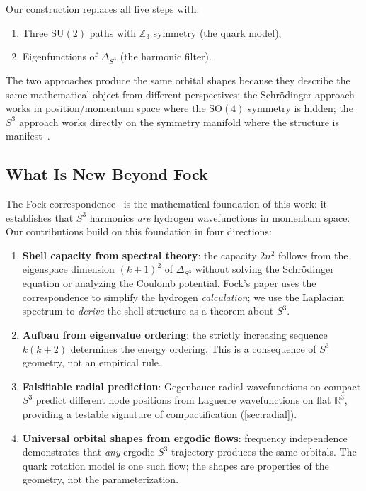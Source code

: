 \documentclass[12pt, a4paper]{article}
\theoremstyle{definition}
\theoremstyle{remark}
\newcommand{\Sthree}{S^3}
\newcommand{\SU}{\mathrm{SU}(2)}
\newcommand{\SO}{\mathrm{SO}}
\newcommand{\R}{\mathbb{R}}
\newcommand{\Z}{\mathbb{Z}}
\newcommand{\lap}{\Delta_{\Sthree}}
\begin{document}
Our construction replaces all five steps with:
\begin{enumerate}[nosep]
  \item Three $\SU$ paths with $\Z_3$ symmetry (the quark model),
  \item Eigenfunctions of $\lap$ (the harmonic filter).
\end{enumerate}

The two approaches produce the same orbital shapes because they describe
the same mathematical object from different perspectives: the Schr\"odinger
approach works in position/momentum space where the $\SO(4)$ symmetry is
hidden; the $\Sthree$ approach works directly on the symmetry manifold
where the structure is manifest~\cite{fock1935,bander1966}.

\subsection{What Is New Beyond Fock}

The Fock correspondence~\cite{fock1935} is the mathematical foundation of
this work: it establishes that $\Sthree$ harmonics \emph{are} hydrogen
wavefunctions in momentum space. Our contributions build on this foundation
in four directions:

\begin{enumerate}[nosep]
  \item \textbf{Shell capacity from spectral theory}: the capacity $2n^2$
    follows from the eigenspace dimension $(k{+}1)^2$ of $\lap$ without
    solving the Schr\"odinger equation or analyzing the Coulomb
    potential. Fock's paper uses the correspondence to simplify the hydrogen
    \emph{calculation}; we use the Laplacian spectrum to \emph{derive} the
    shell structure as a theorem about $\Sthree$.
  \item \textbf{Aufbau from eigenvalue ordering}: the strictly increasing
    sequence $k(k{+}2)$ determines the energy ordering. This is a
    consequence of $\Sthree$ geometry, not an empirical rule.
  \item \textbf{Falsifiable radial prediction}: Gegenbauer radial
    wavefunctions on compact $\Sthree$ predict different node positions from
    Laguerre wavefunctions on flat $\R^3$, providing a testable signature of
    compactification (\cref{sec:radial}).
  \item \textbf{Universal orbital shapes from ergodic flows}: frequency
    independence demonstrates that \emph{any} ergodic $\Sthree$ trajectory
    produces the same orbitals. The quark rotation model is one such flow;
    the shapes are properties of the geometry, not the parameterization.
\end{enumerate}
\end{document}
